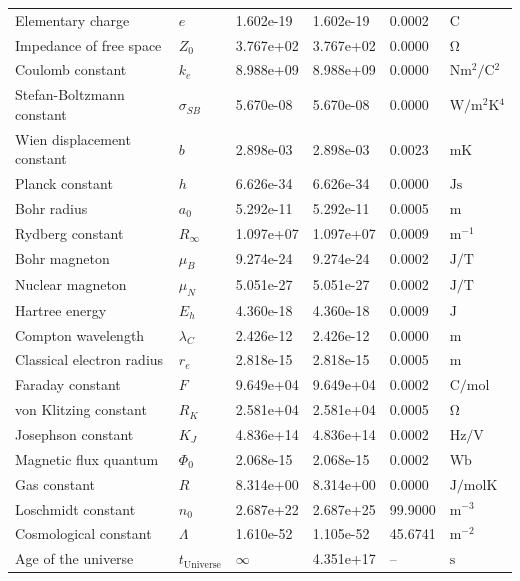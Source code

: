 \documentclass[12pt,a4paper]{report}
\begin{document}
\begin{longtable}{>{\raggedright}p{4.0cm}p{1.2cm}p{1.8cm}p{2.0cm}p{1.6cm}p{2.0cm}}
		Elementary charge & $e$ & 1.602e-19 & 1.602e-19 & 0.0002 & $\si{\coulomb}$ \\
		Impedance of free space & $Z_0$ & 3.767e+02 & 3.767e+02 & 0.0000 & $\si{\ohm}$ \\
		Coulomb constant & $k_e$ & 8.988e+09 & 8.988e+09 & 0.0000 & $\si{\newton \meter^2 \per \coulomb^2}$ \\
		Stefan-Boltzmann constant & $\sigma_{SB}$ & 5.670e-08 & 5.670e-08 & 0.0000 & $\si{\watt \per \meter^2 \kelvin^4}$ \\
		Wien displacement constant & $b$ & 2.898e-03 & 2.898e-03 & 0.0023 & $\si{\meter \kelvin}$ \\
		Planck constant & $h$ & 6.626e-34 & 6.626e-34 & 0.0000 & $\si{\joule \second}$ \\
		Bohr radius & $a_0$ & 5.292e-11 & 5.292e-11 & 0.0005 & $\si{\meter}$ \\
		Rydberg constant & $R_\infty$ & 1.097e+07 & 1.097e+07 & 0.0009 & $\si{\meter^{-1}}$ \\
		Bohr magneton & $\mu_B$ & 9.274e-24 & 9.274e-24 & 0.0002 & $\si{\joule \per \tesla}$ \\
		Nuclear magneton & $\mu_N$ & 5.051e-27 & 5.051e-27 & 0.0002 & $\si{\joule \per \tesla}$ \\
		Hartree energy & $E_h$ & 4.360e-18 & 4.360e-18 & 0.0009 & $\si{\joule}$ \\
		Compton wavelength & $\lambda_C$ & 2.426e-12 & 2.426e-12 & 0.0000 & $\si{\meter}$ \\
		Classical electron radius & $r_e$ & 2.818e-15 & 2.818e-15 & 0.0005 & $\si{\meter}$ \\
		Faraday constant & $F$ & 9.649e+04 & 9.649e+04 & 0.0002 & $\si{\coulomb \per \mole}$ \\
		von Klitzing constant & $R_K$ & 2.581e+04 & 2.581e+04 & 0.0005 & $\si{\ohm}$ \\
		Josephson constant & $K_J$ & 4.836e+14 & 4.836e+14 & 0.0002 & $\si{\hertz \per \volt}$ \\
		Magnetic flux quantum & $\Phi_0$ & 2.068e-15 & 2.068e-15 & 0.0002 & $\si{\weber}$ \\
		Gas constant & $R$ & 8.314e+00 & 8.314e+00 & 0.0000 & $\si{\joule \per \mole \kelvin}$ \\
		Loschmidt constant & $n_0$ & 2.687e+22 & 2.687e+25 & 99.9000 & $\si{\meter^{-3}}$ \\
		Cosmological constant & $\Lambda$ & 1.610e-52 & 1.105e-52 & 45.6741 & $\si{\meter^{-2}}$ \\
		Age of the universe & $t_{\text{Universe}}$ & $\infty$ & 4.351e+17 & -- & $\si{\second}$ \\

\end{longtable}
\end{document}
